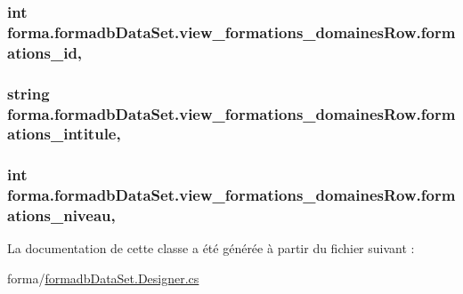 \subsubsection[{\texorpdfstring{formations\+\_\+id}{formations_id}}]{\setlength{\rightskip}{0pt plus 5cm}int forma.\+formadb\+Data\+Set.\+view\+\_\+formations\+\_\+domaines\+Row.\+formations\+\_\+id\hspace{0.3cm}{\ttfamily [get]}, {\ttfamily [set]}}\hypertarget{classforma_1_1formadb_data_set_1_1view__formations__domaines_row_a9580092993404f1bae2fa732db67f84b}{}\label{classforma_1_1formadb_data_set_1_1view__formations__domaines_row_a9580092993404f1bae2fa732db67f84b}
\subsubsection[{\texorpdfstring{formations\+\_\+intitule}{formations_intitule}}]{\setlength{\rightskip}{0pt plus 5cm}string forma.\+formadb\+Data\+Set.\+view\+\_\+formations\+\_\+domaines\+Row.\+formations\+\_\+intitule\hspace{0.3cm}{\ttfamily [get]}, {\ttfamily [set]}}\hypertarget{classforma_1_1formadb_data_set_1_1view__formations__domaines_row_a8a38ffc9562dbdf6734a98de359b12ff}{}\label{classforma_1_1formadb_data_set_1_1view__formations__domaines_row_a8a38ffc9562dbdf6734a98de359b12ff}
\subsubsection[{\texorpdfstring{formations\+\_\+niveau}{formations_niveau}}]{\setlength{\rightskip}{0pt plus 5cm}int forma.\+formadb\+Data\+Set.\+view\+\_\+formations\+\_\+domaines\+Row.\+formations\+\_\+niveau\hspace{0.3cm}{\ttfamily [get]}, {\ttfamily [set]}}\hypertarget{classforma_1_1formadb_data_set_1_1view__formations__domaines_row_a7dfe0d93d95de74464fae89262e975ba}{}\label{classforma_1_1formadb_data_set_1_1view__formations__domaines_row_a7dfe0d93d95de74464fae89262e975ba}


La documentation de cette classe a été générée à partir du fichier suivant \+:\begin{DoxyCompactItemize}
\item 
forma/\hyperlink{formadb_data_set_8_designer_8cs}{formadb\+Data\+Set.\+Designer.\+cs}\end{DoxyCompactItemize}
